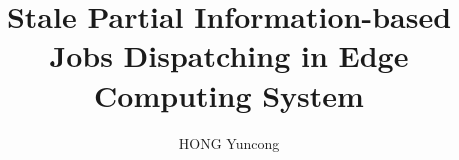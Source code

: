 \documentclass[10pt, conference]{IEEEtran}
\theoremstyle{definition}
\theoremstyle{remark}
\theoremstyle{plain}
\begin{document}
    \title{Stale Partial Information-based Jobs Dispatching in Edge Computing System}
    \author{HONG Yuncong}
    \maketitle

    

    
    
    

    
    

    
    
    

    \clearpage
    
    
\end{document}
